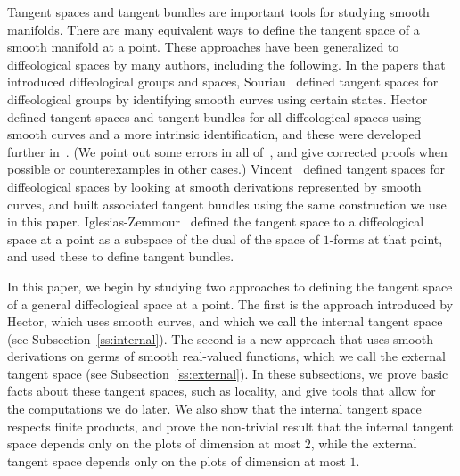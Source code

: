 \documentclass{amsart}
\theoremstyle{remark}
\begin{document}
Tangent spaces and tangent bundles are important tools for studying
smooth manifolds.
There are many equivalent ways to define the tangent space of a smooth manifold
at a point.
These approaches have been generalized to diffeological spaces by many
authors, including the following.
In the papers that introduced diffeological groups and spaces,
Souriau~\cite{So1,So2} defined tangent spaces for diffeological groups
by identifying smooth curves using certain states.
Hector~\cite{He} defined tangent spaces and tangent bundles for all diffeological
spaces using smooth curves and a more intrinsic identification,
and these were developed further in~\cite{HM,La}.
(We point out some errors in all of~\cite{He,HM,La}, and give
corrected proofs when possible or counterexamples in other cases.)
%
%
%
%
%
%
%
%
%
%
%
%
%
%
%
%
%
%
%
%
%
%
Vincent~\cite{V} defined tangent spaces for diffeological spaces
by looking at smooth derivations represented by smooth curves,
and built associated tangent bundles using the same construction we use
in this paper.
Iglesias-Zemmour~\cite[6.53]{I3} defined the tangent space to a
diffeological space at a point as a subspace of the dual of the
space of $1$-forms at that point, and used these to define tangent bundles.
%
%

In this paper, we begin by studying two approaches to defining
the tangent space of a general diffeological space at a point.
The first is the approach introduced by Hector, which uses smooth curves,
and which we call the internal tangent space (see Subsection~\ref{ss:internal}).
The second is a new approach that uses smooth derivations on germs of smooth real-valued functions,
which we call the external tangent space (see Subsection~\ref{ss:external}).
%
In these subsections, we prove basic facts about these tangent spaces, such as locality,
and give tools that allow for the computations we do later.
We also show that the internal tangent space respects finite products,
and prove the non-trivial result that the internal tangent space
depends only on the plots of dimension at most $2$,
while the external tangent space depends only on the plots of dimension at most $1$.
%
%
\end{document}
